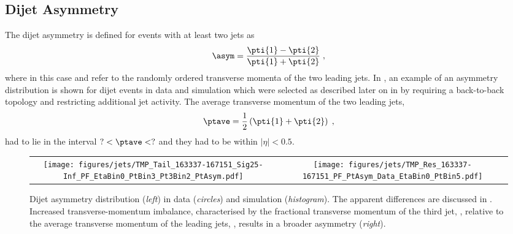 \subsection{Dijet Asymmetry} \label{sec:Jets:Resolution:Asymmetry}
The dijet asymmetry \asym is defined for events with at least two jets as
\begin{equation}
  \label{eq:Jets:Resolution:Asymmetry:DijetAsymmetry}
  \asym = \frac{\pti{1}-\pti{2}}{\pti{1}+\pti{2}} \;,
\end{equation}
where in this case  and  refer to the randomly ordered transverse momenta of the two leading jets.
In , an example of an asymmetry distribution is shown for dijet events in data and simulation which were selected as described later on in  by requiring a back-to-back topology and restricting additional jet activity.
The average transverse momentum of the two leading jets,
\begin{equation*}
  \ptave = \frac{1}{2}\left(\pti{1} + \pti{2}\right) \;,
\end{equation*}
had to lie in the interval \mbox{$? < \ptave < ?$} and they had to be within \mbox{$|\eta| < 0.5$}.
\begin{figure}[!ht]
  \centering
  \begin{tabular}{cc}
    \texttt{[image: figures/jets/TMP\_Tail\_163337-167151\_Sig25-Inf\_PF\_EtaBin0\_PtBin3\_Pt3Bin2\_PtAsym.pdf]} &
    \texttt{[image: figures/jets/TMP\_Res\_163337-167151\_PF\_PtAsym\_Data\_EtaBin0\_PtBin5.pdf]} \\
  \end{tabular}
  \caption{Dijet asymmetry distribution (\textit{left}) in data (\textit{circles}) and simulation (\textit{histogram}).
    The apparent differences are discussed in \qsec{}.
    Increased transverse-momentum imbalance, characterised by the fractional transverse momentum of the third jet, , relative to the average transverse momentum of the leading jets, \ptave, results in a broader asymmetry (\textit{right}).
  }
  \label{fig:Jets:Resolution:Asymmetry:Asym}
\end{figure}

